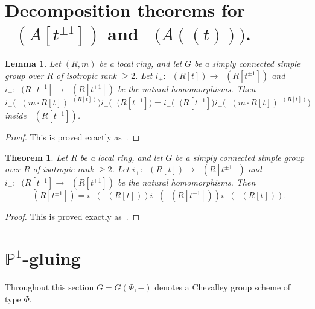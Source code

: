 \documentclass[oneside,12pt]{amsart}
\newtheorem{thm}{Theorem}
\numberwithin{equation}{section}
\newtheorem{lem}{Lemma}
\numberwithin{lem}{section}
\theoremstyle{definition}
\theoremstyle{remark}
\DeclareMathOperator{\St}{St^G}
\newcommand{\Pro}{\mathbb{P}}
\begin{document}
\section{Decomposition theorems for \texorpdfstring{$\St(A[t^{\pm 1}])$}{St(A[t, t\textminussuperior\textonesuperior])} and \texorpdfstring{$\St\bigl(A((t))\bigr)$}{St(A((t)))}.}

\begin{lem}
 Let $(R,m)$ be a local ring, and let $G$ be a simply connected simple group over $R$
of isotropic rank $\ge 2$. Let $i_+:\St(R[t])\to\St(R[t^{\pm 1}])$ and $i_-:\St(R[t^{-1}]\to
\St(R[t^{\pm 1}])$ be the natural homomorphisms.
Then
$$
i_+\bigl(\St(m\cdot R[t])^{\St(R[t])}\bigr)i_-\bigl(\St(R[t^{-1}]\bigr)=i_-\bigl(\St(R[t^{-1}]\bigr)
i_+\bigl(\St(m\cdot R[t])^{\St(R[t])}\bigr)
$$
inside $\St(R[t^{\pm 1}])$.
\end{lem}
\begin{proof}
This is proved exactly as~\cite[Lemma 5.12]{St-poly}.
\end{proof}


\begin{thm}\label{thm:3t}
Let $R$ be a local ring, and let $G$ be a simply connected simple group over $R$
of isotropic rank $\ge 2$. Let $i_+:\St(R[t])\to\St(R[t^{\pm 1}])$ and $i_-:\St(R[t^{-1}]\to
\St(R[t^{\pm 1}])$ be the natural homomorphisms.
Then
$$
\St(R[t^{\pm 1}])=i_+(\St(R[t]))i_-(\St(R[t^{-1}]))i_+(\St(R[t])).
$$
\end{thm}
\begin{proof}
This is proved exactly as~\cite[Theorem 5.1]{St-poly}.
\end{proof}




\section{\texorpdfstring{$\Pro^1$}{P\textonesuperior}-gluing}
Throughout this section $G=G(\Phi, -)$ denotes a Chevalley group scheme of type $\Phi$.
\end{document}
